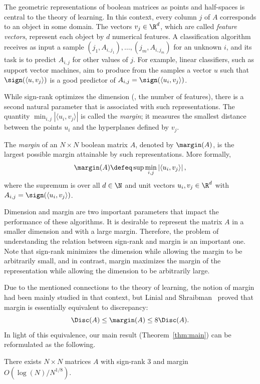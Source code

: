 The geometric representations of boolean matrices as points and half-spaces is central to the  theory of learning. In this context, every column $j$ of $A$ corresponds to an object in some domain. The vectors $v_j \in \R^d$, which are called \emph{feature vectors}, represent each object by  $d$ numerical features.  A classification algorithm receives as input a sample $(j_1,A_{i,j_1}),\ldots,(j_m,A_{i,j_m})$ for an unknown $i$, and its task is to predict $A_{i,j}$ for other values of $j$. For example, linear classifiers, such as support vector machines, aim to produce from the samples a vector $u$ such that $\sign(\langle u,v_j\rangle)$ is a good predictor of $A_{i,j}=\sign(\langle u_i,v_j\rangle)$. 


While sign-rank optimizes the dimension (\ie, the number of features), there is a second natural parameter that is associated with such representations. The quantity $\min_{i,j} |\langle u_i,v_j \rangle|$ is called the \emph{margin}; it measures the smallest distance between the points $u_i$ and the hyperplanes defined by $v_j$.   

The \emph{margin} of an $N \times N$ boolean matrix  $A$, denoted by $\margin(A)$, is the largest possible margin attainable by such representations. More formally,  
$$\margin(A) \defeq \sup \min_{i,j}\left|\langle u_i,v_j \rangle \right|,$$
where the supremum is over all $d \in \N$ and  unit vectors $u_i, v_j \in \R^d$ with $A_{i,j}=\sign(\langle u_i,v_j \rangle)$. 
 
Dimension and margin are two important parameters that impact   the performance of these algorithms. It is desirable to represent the matrix $A$ in a smaller dimension and with a large margin. Therefore, the problem of understanding the relation between sign-rank and margin is an important one. Note that sign-rank minimizes the dimension while allowing the margin to be arbitrarily small, and in contrast, margin maximizes the margin of the representation while allowing the dimension to be arbitrarily large.


Due to the mentioned connections to the theory of learning, the notion of margin had been mainly studied in that context, but Linial and Shraibman~\cite{MR2497381} proved that margin is essentially equivalent to discrepancy:
$$\Disc(A) \le \margin(A) \le 8 \Disc(A).$$
In light of this equivalence, our main result (Theorem~\ref{thm:main}) can be reformulated as the following. 

\begin{theorem}
\label{thm:signrankMargin}
There exists   $N \times N$ matrices $A$ with sign-rank $3$ and   margin $O(\log(N)/N^{1/8}).$
\end{theorem}

